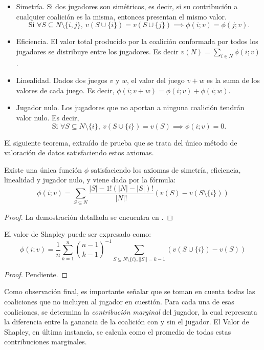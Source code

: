 \begin{itemize}
  \item Simetría. Si dos jugadores son simétricos, es decir,
  si su contribución a cualquier coalición es la misma,
  entonces presentan el mismo valor.
  $$\text{Si } \forall S \subseteq N \setminus \{i, j\},\ 
  v(S \cup \{i\}) = v(S \cup \{j\}) \implies \phi(i;v) =
  \phi(j;v).$$

  \item Eficiencia. El valor total producido por la coalición
  conformada por todos los jugadores se distribuye entre los
  jugadores. Es decir $v(N)=\sum_{i\in N}\phi(i;v)$.

  \item Linealidad. Dados dos juegos $v$ y $w$, el valor del
  juego $v+w$ es la suma de los valores de cada juego. Es decir,
  $\phi(i;v+w)=\phi(i;v)+\phi(i;w)$.

  \item Jugador nulo. Los jugadores que no aportan a ninguna
  coalición tendrán valor nulo. Es decir,
  $$\text{Si } \forall S \subseteq N \setminus \{i\},\ 
  v(S \cup \{i\}) = v(S) \implies \phi(i;v) = 0.$$
\end{itemize}

El siguiente teorema, extraído de \cite{shapleyValue} prueba
que se trata del único método de valoración de datos satisfaciendo
estos axiomas.

\begin{theorem}
  Existe una única función $\phi$ satisfaciendo los axiomas
  de simetría, eficiencia, linealidad y jugador nulo, y viene
  dada por la fórmula:
  $$
  \phi(i;v)=\sum_{S\subseteq N}
  \frac{|S|-1!(|N|-|S|)!}{|N|!}(v(S)-v(S \setminus \{i\}))
  $$
\end{theorem}

\begin{proof}
  La demostración detallada se encuentra en \cite{shapleyValue}.
\end{proof}

\begin{proposition}
  El valor de Shapley puede ser expresado como:
  $$
    \phi(i;v)=\frac{1}{n}\sum_{k=1}^n \binom{n-1}{k-1}^{-1} 
    \sum_{S \subseteq N \setminus \{i \},||S||=k-1}(v(S\cup\{i\})-v(S))
  $$
\end{proposition}

\begin{proof}
  Pendiente.
\end{proof}

Como observación final, es importante señalar que se toman en cuenta
todas las coaliciones que no incluyen al jugador en cuestión.
Para cada una de esas coaliciones, se determina la
\emph{contribución marginal} del jugador, la cual
representa la diferencia entre la ganancia de la coalición
con y sin el jugador.
El Valor de Shapley, en última instancia, se calcula como
el promedio de todas estas contribuciones marginales.


